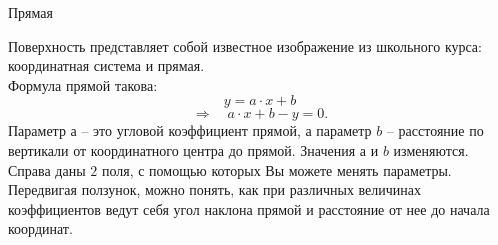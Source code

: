 \documentclass[ru]{./../../common/SurferDesc}%
\begin{document}
\footnotesize
%
 
\begin{surferPage}
  \begin{surferTitle}Прямая\end{surferTitle}
   \begin{surferText}
   
Поверхность представляет собой известное изображение из школьного курса: координатная система и прямая. \\Формула прямой такова:
\[y=a\cdot x + b\]
\[ \Rightarrow \quad a\cdot x +b -y=0.\]
Параметр $а$ – это угловой коэффициент прямой, а параметр $b$ – расстояние по вертикали от координатного центра до прямой.
\newline \newline
Значения $а$ и $b$ изменяются. Справа даны $2$ поля, с помощью которых Вы можете менять параметры. Передвигая ползунок, можно понять, как при различных величинах коэффициентов ведут себя угол наклона прямой и расстояние от нее до начала координат.
     \end{surferText}
\end{surferPage}
\end{document}
